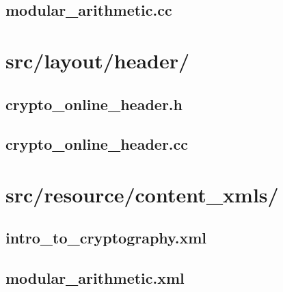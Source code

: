 \subsection{modular\_arithmetic.cc}

\newpage

\section{src/layout/header/}

\subsection{crypto\_online\_header.h}

\newpage

\subsection{crypto\_online\_header.cc}

\newpage

\section{src/resource/content\_xmls/}

\subsection{intro\_to\_cryptography.xml}

\newpage

\subsection{modular\_arithmetic.xml}

\newpage
